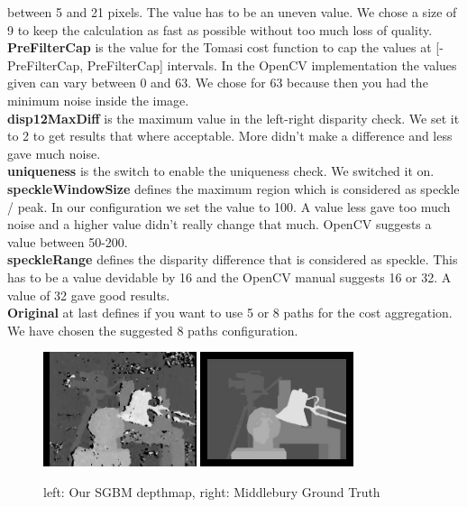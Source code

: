 \documentclass[a4paper]{article}
\begin{document}
between 5 and 21 pixels. The value has to be an uneven value. We chose
a size of 9 to keep the calculation as fast as possible without too much loss of
quality.\\
\textbf{PreFilterCap} is the value for the Tomasi cost function to cap
the values at [-PreFilterCap, PreFilterCap] intervals. In the OpenCV
implementation the values given can vary between 0 and 63. We chose
for 63 because then you had the minimum noise inside the image.\\
\textbf{disp12MaxDiff} is the maximum value in the left-right
disparity check. We set it to 2 to get results that where
acceptable. More didn't make a difference and less gave much noise.\\
\textbf{uniqueness} is the switch to enable the uniqueness check. We
switched it on.\\
\textbf{speckleWindowSize} defines the maximum region which is
considered as speckle / peak. In our configuration we set the value to
100. A value less gave too much noise and a higher value didn't really
change that much. OpenCV suggests a value between 50-200.\\
\textbf{speckleRange} defines the disparity difference that is
considered as speckle. This has to be a value devidable by 16 and the
OpenCV manual suggests 16 or 32. A value of 32 gave good results.\\
\textbf{Original} at last defines if you want to use 5 or 8 paths for
the cost aggregation. We have chosen the suggested 8 paths configuration.

\begin{figure} [h!tb]
  \centering
  \includegraphics[width=0.4\textwidth]{sgbm_tsukuba_own}
  \includegraphics[width=0.4\textwidth]{disp_tsukuba_orig}
  \caption{left: Our SGBM depthmap, right: Middlebury Ground Truth}
  \label{sgbm_comp}
\end{figure}
\end{document}
